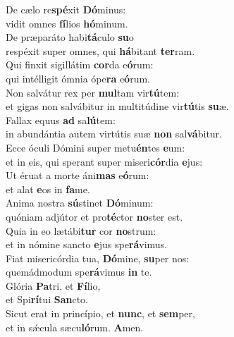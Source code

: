 \evenverse De cælo re\textbf{spé}xit \textbf{Dó}minus:~\*\\
\evenverse vidit omnes \textbf{fí}lios \textbf{hó}minum.\\
\oddverse De præparáto habi\textbf{tá}culo \textbf{su}o~\*\\
\oddverse respéxit super omnes, qui \textbf{há}bitant \textbf{ter}ram.\\
\evenverse Qui finxit sigillátim \textbf{cor}da e\textbf{ó}rum:~\*\\
\evenverse qui intélligit ómnia ópe\textbf{ra} e\textbf{ó}rum.\\
\oddverse Non salvátur rex per \textbf{mul}tam vir\textbf{tú}tem:~\*\\
\oddverse et gigas non salvábitur in multitúdine vir\textbf{tú}tis \textbf{su}æ.\\
\evenverse Fallax equus \textbf{ad} sa\textbf{lú}tem:~\*\\
\evenverse in abundántia autem virtútis suæ \textbf{non} sal\textbf{vá}bitur.\\
\oddverse Ecce óculi Dómini super metu\textbf{én}tes \textbf{e}um:~\*\\
\oddverse et in eis, qui sperant super miseri\textbf{cór}dia \textbf{e}jus:\\
\evenverse Ut éruat a morte áni\textbf{mas} e\textbf{ó}rum:~\*\\
\evenverse et alat \textbf{e}os in \textbf{fa}me.\\
\oddverse Anima nostra \textbf{sú}stinet \textbf{Dó}minum:~\*\\
\oddverse quóniam adjútor et pro\textbf{té}ctor \textbf{no}ster est.\\
\evenverse Quia in eo lætábi\textbf{tur} cor \textbf{no}strum:~\*\\
\evenverse et in nómine sancto \textbf{e}jus spe\textbf{rá}vimus.\\
\oddverse Fiat misericórdia tua, \textbf{Dó}mine, \textbf{su}per nos:~\*\\
\oddverse quemádmodum spe\textbf{rá}vimus \textbf{in} te.\\
\evenverse Glória \textbf{Pa}tri, et \textbf{Fí}lio,~\*\\
\evenverse et Spi\textbf{rí}tui \textbf{San}cto.\\
\oddverse Sicut erat in princípio, et \textbf{nunc}, et \textbf{sem}per,~\*\\
\oddverse et in sǽcula sæcu\textbf{ló}rum. \textbf{A}men.\\
